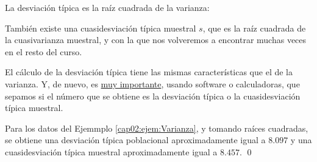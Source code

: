 La {\sf desviación típica}  es la raíz
cuadrada de la varianza:
    \begin{center}
    \end{center}
También existe una {\sf cuasidesviación típica muestral $s$}, que es la
raíz cuadrada de la cuasivarianza muestral, y con la que nos volveremos a encontrar muchas veces en el resto del curso.

El cálculo de la desviación típica tiene las mismas características que el de la varianza. Y, de
nuevo, es \underline{\sf muy importante}, usando software o calculadoras, que sepamos si el número
que se obtiene es la desviación típica o la cuasidesviación típica muestral.

\begin{ejemplo}
Para los datos del Ejemmplo \ref{cap02:ejem:Varianza}, y tomando raíces cuadradas, se obtiene una desviación típica poblacional aproximadamente igual a $8.097$ y una cuasidesviación típica muestral aproximadamente igual a $8.457$.
\qed
\end{ejemplo}
